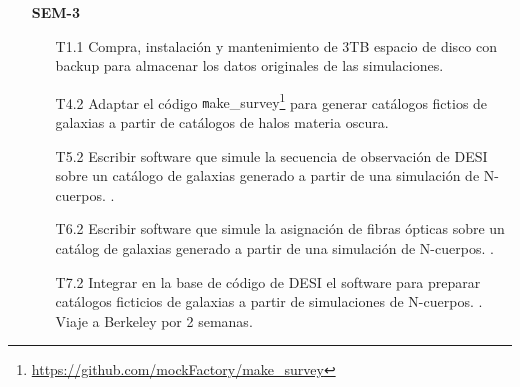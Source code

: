 \begin{itemize}
\begin{itemize}
\item[T2.1] \gradA Generar las condiciones iniciales para 5 vol\'umenes
  cosmol\'ogicos. 
\item[T2.2] \gradA Correr las simulaciones para 5 vol\'umenes LCDM.
\item[T2.3] \gradA Controlar la calidad de los 5 vol\'umenes LCDM.  
Esto se har\'a con la asesor\'ia de Dr. Stefan Gottloeber.
\item[T2.4] \gradA Identificar los halos de materia oscura en los 5
  vol\'umenes LCDM.
\item[T8.1] \gradB Medir la intensidad del efecto AP sobre cat\'alogos
  ficticios de galaxias creados a partir de simulaciones de N-cuerpos.\park
\item[T8.2] \prof Medir la intensidad del efecto AP sobre observaciones
  reales de galaxias. \park. Viaje a Seul por dos semanas.
\end{itemize}


\item[\bf SEM-3]
\begin{itemize}
\item[T1.1] \tecn Compra, instalaci\'on y mantenimiento de 3TB espacio de disco
  con backup para almacenar los datos originales de las simulaciones.
\item[T4.2] \gradA\prof Adaptar el c\'odigo {\texttt
  make\_survey}\footnote{\url{https://github.com/mockFactory/make_survey}}
  para generar  cat\'alogos fictios de galaxias a partir de
  cat\'alogos de halos materia oscura. 
\item[T5.2] \prof Escribir software que simule la secuencia de observaci\'on
  de DESI sobre un cat\'alogo de galaxias generado a partir de una
  simulaci\'on de N-cuerpos. \bob.
\item[T6.2] \prof Escribir software que simule la asignaci\'on de fibras
  \'opticas sobre un cat\'alog de galaxias generado a partir de una
  simulaci\'on de N-cuerpos. \bob.
\item[T7.2] \gradA\prof Integrar en la base de c\'odigo de DESI el software para
  preparar cat\'alogos ficticios de galaxias a partir de simulaciones
  de N-cuerpos. \bob. Viaje a Berkeley por 2 semanas.
\end{itemize}


\end{itemize}
